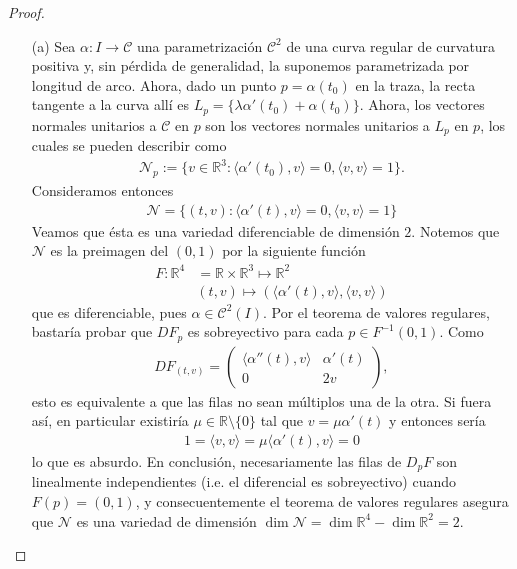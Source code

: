 \documentclass[11pt]{article}
\newcommand{\R}{\mathbb{R}}
\newcommand{\ip}[2]{\langle #1 , #2 \rangle}
\begin{document}
\begin{proof}
\hspace{0.5pt}
\begin{itemize}
\item[(a)] Sea $\alpha : I \to \mathcal{C}$ una parametrizaci\'on $\mathcal{C}^2$ de una curva regular de curvatura positiva y, sin p\'erdida de generalidad, la suponemos parametrizada por longitud de arco. Ahora, dado un punto $p = \alpha(t_0)$ en la traza, la recta tangente a la curva all\'i es $L_p = \{\lambda \alpha'(t_0) + \alpha(t_0)\}$. Ahora, los vectores normales unitarios a $\mathcal{C}$ en $p$ son los vectores normales unitarios a $L_p$ en $p$, los cuales se pueden describir como
\begin{align*}
\mathcal{N}_p := \{v \in \R^3 : \ip{\alpha'(t_0)}{v} = 0, \ip{v}{v} = 1 \}.
\end{align*}
Consideramos entonces
\begin{align*}
\mathcal{N} = \{(t,v) : \ip{\alpha'(t)}{v} = 0, \ip{v}{v} = 1\}
\end{align*}
Veamos que \'esta es una variedad diferenciable de dimensi\'on $2$. Notemos que $\mathcal{N}$ es la preimagen del $(0,1)$ por la siguiente funci\'on
\begin{align*}
F : \R^4& = \R \times \R^3 \mapsto \R^2 \\
& (t,v) \mapsto (\ip{\alpha'(t)}{v},\ip{v}{v})
\end{align*}
que es diferenciable, pues $\alpha \in \mathcal{C}^2(I)$. Por el teorema de valores regulares, bastar\'ia probar que $DF_p$ es sobreyectivo para cada $p \in F^{-1}(0,1)$. Como
\begin{align*}
DF_{(t,v)} = \begin{pmatrix}
\ip{\alpha''(t)}{v} & \alpha'(t) \\
0 & 2v
\end{pmatrix},
\end{align*}
esto es equivalente a que las filas no sean m\'ultiplos una de la otra. Si fuera as\'i, en particular existir\'ia $\mu \in \R \setminus \{0\}$ tal que $v = \mu \alpha'(t)$ y entonces ser\'ia
\begin{align*}
1 = \ip{v}{v} = \mu \ip{\alpha'(t)}{v} = 0
\end{align*}
lo que es absurdo. En conclusi\'on, necesariamente las filas de $D_pF$ son linealmente independientes (i.e. el diferencial es sobreyectivo) cuando $F(p) = (0,1)$, y consecuentemente el teorema de valores regulares asegura que $\mathcal{N}$ es una variedad de dimensi\'on $\dim \mathcal{N} = \dim \R^4 - \dim \R^2 = 2$.

\end{itemize}
\end{proof}
\end{document}
